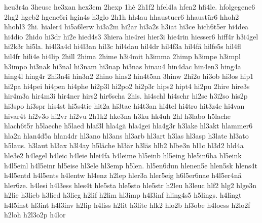 {    heu3r4a
    3heusc
    he3xan
    hex3em
    2hexp
    1hè
    2h1f2
    hfel4la
    hfen2
    hfi4le.
    hfolgegene6
    2hg2
    hgeb2
    hgene6ri
    hgin4s
    h3glo
    2h1h
    hh4au
    hhaustuer6
    hhaustür6
    hhoh2
    hhohl3
    2hi.
    hialer4
    hi5a6lerw
    hi3a2m
    hi2ar
    hi3a2s
    h3iat
    hi3ce
    hich6t5er
    hi4dea
    hi4dio
    2hido
    hi3dr
    hi2e
    hied4s3
    3hiera
    hie4rei
    hier3i
    hie4rin
    hiesser6
    hiff4r
    h3i4gel
    hi2k3r
    hi5la.
    hi4l3a4d
    hi4l3an
    hil3c
    hil4dau
    hil4dr
    hil4f3a
    hil4fä
    hilfe5s
    hil4fl
    hil4fr
    hili4e
    hi4lip
    2hill
    2hima
    2hime
    h3i4mit
    h3imma
    2himp
    h3impe
    h3impl
    h3impo
    hi3nak
    hi3nal
    hi3nam
    hi3nap
    hi3nas
    hinau4
    hin4dac
    hin4en3
    hing4a
    hing4l
    hing4r
    2hi3n4i
    hin3n2
    2hino
    hins2
    hin4t5an
    3hinw
    2hi2o
    hi3ob
    hi3os
    hip1
    hi2pa
    hi4pei
    hi4pen
    hi4phe
    hi2p3l
    hi2po2
    hi2p3r
    hips2
    hipt4
    hi2pu
    2hire
    hire3s
    hir4m3a
    hir4m3i
    hir4ner
    hirs2
    hir6scha
    2his.
    hi4schl
    hi4schr
    hi2se
    h3i2so
    his2p
    hi3spo
    hi3spr
    his4st
    hi5s4tie
    hit2a
    hi3tac
    hi4t3an
    hi4tel
    hi4tro
    hit3z4e
    hi4van
    hivar4t
    hi2v3o
    hi2vr
    hi2vu
    2h1k2
    hke3na
    h3ku
    hk4uh
    2hl
    h3labo
    h5lache
    hlach6t5r
    h5laeche
    h5laed
    hlaf3l
    hla4gä
    hla4gei
    hla4g3r
    h3lake
    hl3akt
    hlammer6
    hla2n
    hlan4d5a
    hlan4dr
    hl3ano
    hl3ans
    hl3arb
    hl3art
    h3las
    hl3asp
    h3late
    hl3ato
    h5laus.
    h3laut
    hl3ax
    h3l4ay
    h5läche
    hl3är
    h3läs
    hlb2
    hlbe3n
    hl1c
    hl3d2
    hld4a
    hle3e2
    h4legel
    h4leic
    h4leie
    hlei4fa
    h4leime
    hl5einb
    hl5eing
    hle5in6ha
    hl5eink
    h4l5einl
    h4l5einr
    hl5eise
    hl3ele
    hl3emp
    h5len.
    hl5en6dun
    hlenen5e
    hlen5sk
    hlens4t
    h4l5entd
    h4l5ents
    h4lentw
    hl4enz
    h2lep
    hler3a
    hler5eig
    h6l5er6nae
    h4l5er4nä
    hler6ze.
    h4lesi
    h4l3ess
    hles4t
    hle5sta
    hle5sto
    hle5str
    h2leu
    h3leuc
    hlf2
    hlg2
    hlge3n
    h2lie
    h3lieb
    h3lied
    h3lieg
    h2lif
    h2lim
    hl3imp
    h4l3inf
    hling4s5
    h5lings.
    h4lingt
    h4l5inst
    hl3int
    h4l3inv
    h2lip
    h4liss
    h2lit
    h3lite
    hlk2
    hlo2b
    hl3obe
    h4loess
    h2lo2f
    h2loh
    h2l3o2p
    h4lor
}
